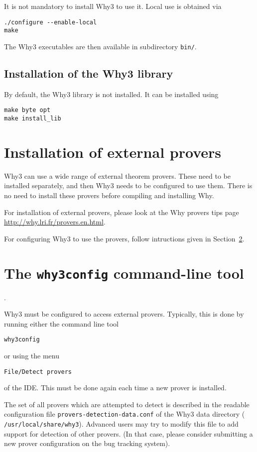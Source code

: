 It is not mandatory to install Why3 to use it. Local use is obtained via
\begin{verbatim}
./configure --enable-local
make
\end{verbatim}
The Why3 executables are then available in subdirectory \texttt{bin/}.

\subsection{Installation of the Why3 library}
\label{sec:installlib}

By default, the Why3 library is not installed. It can be installed using
\begin{verbatim}
make byte opt
make install_lib
\end{verbatim}

\section{Installation of external provers}

Why3 can use a wide range of external theorem provers. These need to
be installed separately, and then Why3 needs to be configured to use
them. There is no need to install these provers before compiling and
installing Why. 

For installation of external provers, please look at the Why provers
tips page \url{http://why.lri.fr/provers.en.html}.

For configuring Why3 to use the provers, follow intructions given in
Section~\ref{sec:why3config}.

\section{The \texttt{why3config} command-line tool}
\label{sec:why3config}.

Why3 must be configured to access external provers. Typically, this is done
by running either the command line tool
\begin{verbatim}
why3config
\end{verbatim}
or using the menu
\begin{verbatim}
File/Detect provers
\end{verbatim}
of the IDE. This must be done again each time a new prover is installed.

The set of all provers which are attempted to detect is described in
the readable configuration file \texttt{provers-detection-data.conf}
of the Why3 data directory (\eg{}
\texttt{/usr/local/share/why3}). Advanced users may try to modify this
file to add support for detection of other provers. (In that case,
please consider submitting a new prover configuration on the bug
tracking system).

